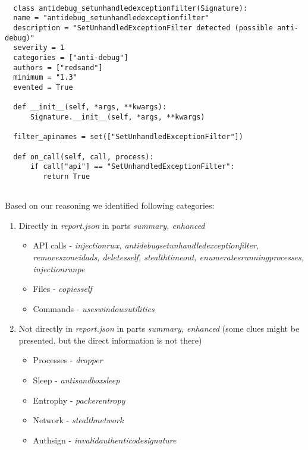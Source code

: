 \begin{lstlisting}[language=mypython, caption={Example of signature implementation},captionpos=b, label={lst:signatureimpl}]
  
  class antidebug_setunhandledexceptionfilter(Signature):
  name = "antidebug_setunhandledexceptionfilter"
  description = "SetUnhandledExceptionFilter detected (possible anti-debug)"
  severity = 1
  categories = ["anti-debug"]
  authors = ["redsand"]
  minimum = "1.3"
  evented = True

  def __init__(self, *args, **kwargs):
      Signature.__init__(self, *args, **kwargs)

  filter_apinames = set(["SetUnhandledExceptionFilter"])

  def on_call(self, call, process):
      if call["api"] == "SetUnhandledExceptionFilter":
         return True
  
\end{lstlisting}


Based on our reasoning we identified following categories:

\begin{enumerate}
  \item Directly in \emph{report.json} in parts \emph{summary, enhanced}
  \begin{itemize}
    \item API calls - \emph{injectionrwx, antidebugsetunhandledexceptionfilter, removeszoneidads, deletesself, stealthtimeout, enumeratesrunningprocesses, injectionrunpe}
    \item Files - \emph{copiesself}
    \item Commands - \emph{useswindowsutilities}
  \end{itemize}
  \item Not directly in \emph{report.json} in parts \emph{summary, enhanced} (some clues might be presented, but the direct information is not there)
  \begin{itemize}
    \item Processes - \emph{dropper}
    \item Sleep - \emph{ antisandboxsleep}
    \item Entrophy - \emph{packerentropy}
    \item Network - \emph{stealthnetwork}
    \item Authsign - \emph{invalidauthenticodesignature}
  \end{itemize}
\end{enumerate}

